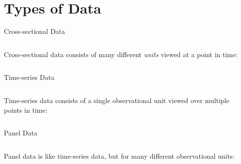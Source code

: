 \documentclass[aspectratio=169,t,11pt,table]{beamer}
\begin{document}
\section{Types of Data}

\begin{frame}{Cross-sectional Data}
  
  \begin{columns}[T]
    \begin{column}{.4\textwidth}
      \alert{Cross-sectional data} consists of many different \emph{units} viewed at a point in time:
    \end{column}
    \begin{column}{.6\textwidth}
      \vspace*{-\bigskipamount}
      
    \end{column}
  \end{columns}
\end{frame}

\begin{frame}{Time-series Data}
  \begin{columns}[T]
    \begin{column}{.4\textwidth}
      \alert{Time-series data} consists of a single observational unit viewed over multiple points in time:
    \end{column}
    \begin{column}{.6\textwidth}
      \vspace*{-\bigskipamount}
      
    \end{column}
  \end{columns}
\end{frame}

\begin{frame}{Panel Data}
  \begin{columns}[T]
    \begin{column}{.4\textwidth}
      \alert{Panel data} is like time-series data, but for many different observational units:
    \end{column}
    \begin{column}{.6\textwidth}
      \vspace*{-\bigskipamount}
      
    \end{column}
  \end{columns}
\end{frame}
\end{document}
